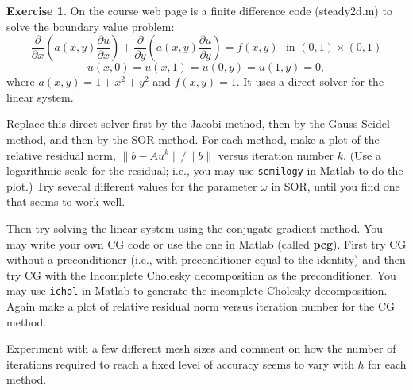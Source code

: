 \documentclass[12pt]{article}
\theoremstyle{definition}
\newtheorem{exer}{Exercise}
\theoremstyle{remark}
\begin{document}
\newpage

\begin{exer}
      On the course web page
is a finite difference code (steady2d.m) to solve the boundary value
problem:
\[
\frac{\partial}{\partial x} \left( a(x,y) \frac{\partial u}{\partial x}
\right) +
\frac{\partial}{\partial y} \left( a(x,y) \frac{\partial u}{\partial y}
\right) = f(x,y)~~~\mbox{in } (0,1) \times (0,1)
\]
\[
u(x,0) = u(x,1) = u(0,y) = u(1,y) = 0 ,
\]
where $a(x,y) = 1 + x^2 + y^2$ and $f(x,y) = 1$.
It uses a direct solver for the linear system.

Replace this direct solver first by the Jacobi method, then by the Gauss
Seidel method, and then by the SOR method.
For each method, make a plot of the relative residual norm,
$\| b - A u^k \| / \| b \|$ versus iteration number $k$.
(Use a logarithmic scale for the residual; i.e., you may use \verb+semilogy+
in Matlab to do the plot.)
Try several different values for the parameter $\omega$ in SOR,
until you find one that seems to work well.

Then try solving the linear system using the conjugate gradient
method.  You may write your own CG code or use the one in Matlab
(called {\bf pcg}).  First try CG without a preconditioner
(i.e., with preconditioner equal to the identity) and then try CG
with the Incomplete Cholesky decomposition as the preconditioner.
You may use \verb+ichol+ in Matlab to generate the incomplete Cholesky 
decomposition.  Again make a plot of relative residual norm versus 
iteration number for the CG method.

Experiment with a few different mesh sizes and comment on how the
number of iterations required to reach a fixed level of accuracy
seems to vary with $h$ for each method.

\end{exer}
\end{document}
